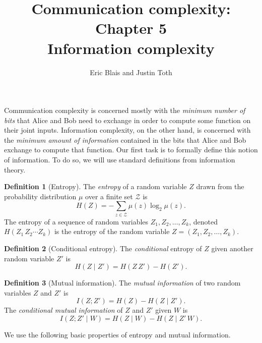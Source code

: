 \documentclass[11pt]{amsart}
\title{Communication complexity: Chapter 5 \\ Information complexity}
\author{Eric Blais and Justin Toth}
\theoremstyle{plain}
\theoremstyle{definition}
\newtheorem{definition}{Definition}
\theoremstyle{plain}
\newcommand{\calZ}{\mathcal{Z}}
\begin{document}
\maketitle

Communication complexity is concerned mostly with the \emph{minimum number of bits} that Alice and Bob need to exchange in order to compute some function on
their joint inputs. Information complexity, on the other hand, is concerned with
the \emph{minimum amount of information} contained in the bits that Alice and
Bob exchange to compute that function. Our first task is to formally define this notion of information. To do so, we will use standard definitions from information theory.

\begin{definition}[Entropy]
The \emph{entropy} of a random variable $Z$ drawn from the probability distribution $\mu$ over a finite set $\calZ$ is
\[
H(Z) = - \sum_{z \in \calZ} \mu(z) \log_2 \mu(z).
\]
The entropy of a sequence of random variables $Z_1,Z_2,\ldots,Z_k$, denoted $H(Z_1\,Z_2\cdots Z_k)$ is the entropy of the random variable $Z = (Z_1,Z_2,\ldots,Z_k)$.
\end{definition}

\begin{definition}[Conditional entropy]
The \emph{conditional} entropy of $Z$ given another random variable $Z'$ is
\[
H(Z \mid Z') = H(Z\,Z') - H(Z').
\]
\end{definition}

\begin{definition}[Mutual information]
The \emph{mutual information} of two random variables $Z$ and $Z'$ is
\[
I( Z ; Z' ) = H(Z) - H(Z \mid Z').
\]
The \emph{conditional mutual information} of $Z$ and $Z'$ given $W$ is
\[
I( Z ; Z' \mid W) = H(Z \mid W) - H(Z \mid Z'\, W).
\]
\end{definition}

We use the following basic properties of entropy and mutual information.
\end{document}
